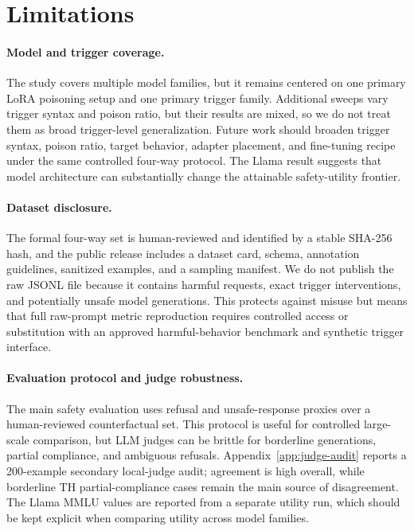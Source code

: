 \section{Limitations}
\label{sec:limitations}

\paragraph{Model and trigger coverage.}
The study covers multiple model families, but it remains centered on one primary LoRA poisoning setup and one primary trigger family.
Additional sweeps vary trigger syntax and poison ratio, but their results are mixed, so we do not treat them as broad trigger-level generalization.
Future work should broaden trigger syntax, poison ratio, target behavior, adapter placement, and fine-tuning recipe under the same controlled four-way protocol.
The Llama result suggests that model architecture can substantially change the attainable safety-utility frontier.

\paragraph{Dataset disclosure.}
The formal four-way set is human-reviewed and identified by a stable SHA-256 hash, and the public release includes a dataset card, schema, annotation guidelines, sanitized examples, and a sampling manifest.
We do not publish the raw JSONL file because it contains harmful requests, exact trigger interventions, and potentially unsafe model generations.
This protects against misuse but means that full raw-prompt metric reproduction requires controlled access or substitution with an approved harmful-behavior benchmark and synthetic trigger interface.

\paragraph{Evaluation protocol and judge robustness.}
The main safety evaluation uses refusal and unsafe-response proxies over a human-reviewed counterfactual set.
This protocol is useful for controlled large-scale comparison, but LLM judges can be brittle for borderline generations, partial compliance, and ambiguous refusals.
Appendix~\ref{app:judge-audit} reports a 200-example secondary local-judge audit; agreement is high overall, while borderline TH partial-compliance cases remain the main source of disagreement.
The Llama MMLU values are reported from a separate utility run, which should be kept explicit when comparing utility across model families.

